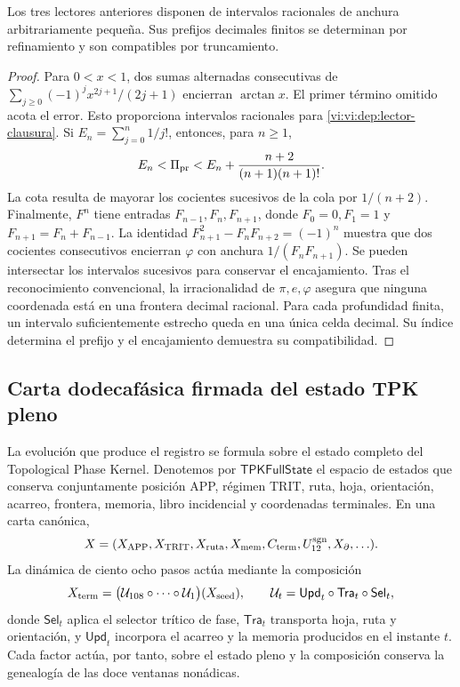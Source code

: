 \begin{proposition}
\label{vi:vi:dep:prefijos}
Los tres lectores anteriores disponen de intervalos racionales de anchura
arbitrariamente pequeña. Sus prefijos decimales finitos se determinan por
refinamiento y son compatibles por truncamiento.
\end{proposition}
\begin{proof}
Para \(0<x<1\), dos sumas alternadas consecutivas de
\(\sum_{j\ge0}(-1)^jx^{2j+1}/(2j+1)\) encierran \(\arctan x\).
El primer término omitido acota el error. Esto proporciona intervalos
racionales para \eqref{vi:vi:dep:lector-clausura}.
Si \(E_n=\sum_{j=0}^n1/j!\), entonces, para \(n\ge1\),
\[
 E_n<\Pi_{\rm pr}<E_n+
 \frac{n+2}{(n+1)(n+1)!}.
\]
La cota resulta de mayorar los cocientes sucesivos de la cola por
\(1/(n+2)\). Finalmente, \(F^n\) tiene entradas
\(F_{n-1},F_n,F_{n+1}\), donde \(F_0=0,F_1=1\) y
\(F_{n+1}=F_n+F_{n-1}\). La identidad
\(F_{n+1}^2-F_nF_{n+2}=(-1)^n\) muestra que dos cocientes consecutivos
encierran \(\varphi\) con anchura \(1/(F_nF_{n+1})\).
Se pueden intersectar los intervalos sucesivos para conservar el
encajamiento. Tras el reconocimiento convencional, la irracionalidad de
\(\pi,e,\varphi\) asegura que ninguna coordenada está en una frontera
decimal racional. Para cada profundidad finita, un intervalo
suficientemente estrecho queda en una única celda decimal. Su índice
determina el prefijo y el encajamiento demuestra su compatibilidad.
\end{proof}

\subsection{Carta dodecafásica firmada del estado TPK pleno}
\label{vi:vi:dep:estado-pleno}

La evolución que produce el registro se formula sobre el estado completo del
Topological Phase Kernel. Denotemos por
\(\mathsf{TPKFullState}\) el espacio de estados que conserva conjuntamente
posición APP, régimen TRIT, ruta, hoja, orientación, acarreo, frontera,
memoria, libro incidencial y coordenadas terminales. En una carta canónica,
\[
 X=(X_{\rm APP},X_{\rm TRIT},X_{\rm ruta},X_{\rm mem},
       C_{\rm term},U_{12}^{\rm sgn},X_{\partial},\ldots).
\]
La dinámica de ciento ocho pasos actúa mediante la composición
\begin{equation}
 X_{\rm term}
 =\bigl(\mathcal U_{108}\circ\cdots\circ\mathcal U_1\bigr)(X_{\rm seed}),
 \qquad
 \mathcal U_t=\mathsf{Upd}_t\circ\mathsf{Tra}_t\circ\mathsf{Sel}_t,
 \label{vi:vi:dep:estado-terminal-108}
\end{equation}
donde \(\mathsf{Sel}_t\) aplica el selector trítico de fase,
\(\mathsf{Tra}_t\) transporta hoja, ruta y orientación, y
\(\mathsf{Upd}_t\) incorpora el acarreo y la memoria producidos en el
instante \(t\). Cada factor actúa, por tanto, sobre el estado pleno y la
composición conserva la genealogía de las doce ventanas nonádicas.


